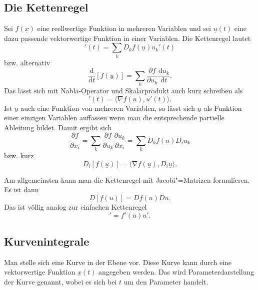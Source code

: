 \documentclass[a4paper,11pt,fleqn,twocolumn,twoside]{scrartcl}
\numberwithin{equation}{section}
\begin{document}
\subsection{Die Kettenregel}

Sei $f(\underline x)$ eine reellwertige Funktion in mehreren
Variablen und sei $\underline u(t)$ eine dazu passende
vektorwertige Funktion in einer Variablen. Die Kettenregel lautet
\begin{equation}
[f(\underline u)]'(t) = \sum_k D_kf(\underline u)u_k'(t)
\end{equation}
bzw. alternativ
\begin{equation}
\frac{\mathrm d}{\mathrm dt}[f(\underline u)]
= \sum_k \frac{\partial f}{\partial u_k}\frac{\mathrm du_k}{\mathrm dt}.
\end{equation}
\noindent
Das lässt sich mit Nabla-Operator und Skalarprodukt auch kurz schreiben als
\begin{equation}
[f(\underline u)]'(t)
= \langle\nabla f(\underline u),\underline u'(t)\rangle.
\end{equation}
Ist $\underline u$ auch eine Funktion von mehreren Variablen,
so lässt sich $\underline u$
als Funktion einer einzigen Variablen auffassen wenn man die entsprechende
partielle Ableitung bildet. Damit ergibt sich
\begin{equation}
\frac{\partial f}{\partial x_i}
= \sum_k\frac{\partial f}{\partial u_k}\frac{\partial u_k}{\partial x_i}
= \sum_k D_k f(\underline u) D_i u_k
\end{equation}
bzw. kurz
\begin{equation}
D_i [f(\underline u)] = \langle\mathrm \nabla f(\underline u),
D_i\underline u\rangle.
\end{equation}

\noindent
Am allgemeinsten kann man die Kettenregel mit Jacobi"=Matrizen
formulieren.
Es ist dann
\begin{equation}
D[f(u)] = Df(u)Du.
\end{equation}
\noindent
Das ist völlig analog zur einfachen Kettenregel
\begin{equation}
[f(u)]' = f'(u)u'.
\end{equation}

\subsection{Kurvenintegrale}

Man stelle sich eine Kurve in der Ebene vor. Diese Kurve kann durch
eine vektorwertige Funktion $\underline x(t)$ angegeben werden.
Das wird Parameterdarstellung der Kurve genannt, wobei es sich bei
$t$ um den Parameter handelt.
\end{document}
